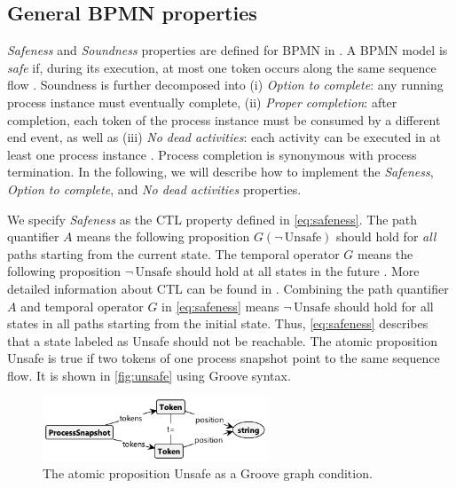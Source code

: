 \documentclass{lmcs} %
\begin{document}
\subsection{General BPMN properties}
\textit{Safeness} and \textit{Soundness} properties are defined for BPMN in \cite{corradiniClassificationBPMNCollaborations2018}.
A BPMN model is \textit{safe} if, during its execution, at most one token occurs along the same sequence flow \cite{corradiniClassificationBPMNCollaborations2018}.
Soundness is further decomposed into (i) \textit{Option to complete}: any running process instance must eventually complete, (ii) \textit{Proper completion}: after completion, each token of the process instance must be consumed by a different end event, as well as (iii) \textit{No dead activities}: each activity can be executed in at least one process instance \cite{corradiniClassificationBPMNCollaborations2018}.
Process completion is synonymous with process termination.
In the following, we will describe how to implement the \textit{Safeness}, \textit{Option to complete}, and \textit{No dead activities} properties.

We specify \textit{Safeness} as the CTL property defined in \eqref{eq:safeness}.
The path quantifier $A$ means the following proposition $G(\neg \,\text{Unsafe})$ should hold for \textit{all} paths starting from the current state.
The temporal operator $G$ means the following proposition $\neg \,\text{Unsafe}$ should hold at all states in the future \cite{clarkeHandbookModelChecking2018}.
More detailed information about CTL can be found in \cite{clarkeHandbookModelChecking2018, baierPrinciplesModelChecking2008}.
Combining the path quantifier $A$ and temporal operator $G$ in \eqref{eq:safeness} means $\neg \,\text{Unsafe}$ should hold for all states in all paths starting from the initial state.
Thus, \eqref{eq:safeness} describes that a state labeled as \textsf{Unsafe} should not be reachable.
The atomic proposition \textsf{Unsafe} is true if two tokens of one process snapshot point to the same sequence flow.
It is shown in \autoref{fig:unsafe} using Groove syntax.

\begin{figure}[ht]
    \centering
    \includegraphics[width=0.6\textwidth]{images/Unsafe.pdf}
    \caption{The atomic proposition \textsf{Unsafe} as a Groove graph condition.}
    \label{fig:unsafe}
\end{figure}
\end{document}
